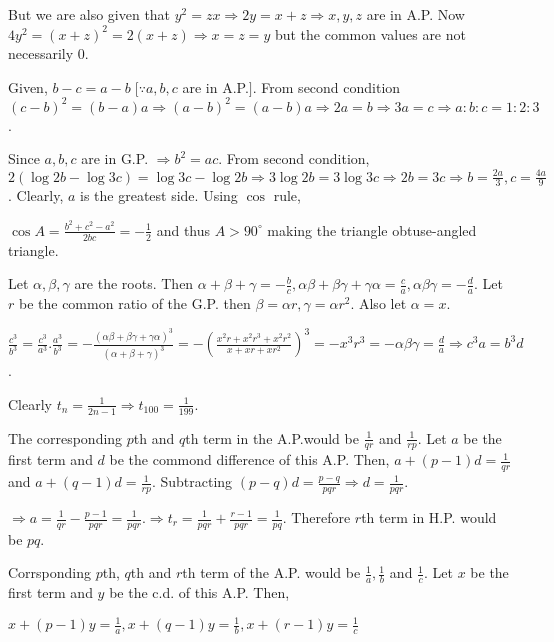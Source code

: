   But we are also given that $y^2 = zx \Rightarrow 2y = x + z \Rightarrow x, y, z$ are in A.P. Now $4y^2 =
  (x + z)^2 = 2(x + z) \Rightarrow x = z = y$ but the common values are not necessarily $0$.
\item Given, $b - c = a - b\;[\because a, b, c$ are in A.P.$]$. From second condition $(c - b)^2 = (b - a)a
  \Rightarrow (a - b)^2 = (a - b)a \Rightarrow 2a = b \Rightarrow 3a = c \Rightarrow a:b:c = 1:2:3$.
\item Since $a, b, c$ are in G.P. $\Rightarrow b^2 = ac$. From second condition, $2(\log 2b - \log 3c) =
  \log 3c - \log 2b \Rightarrow 3\log 2b = 3\log 3c \Rightarrow 2b = 3c \Rightarrow b = \frac{2a}{3}, c =
  \frac{4a}{9}$. Clearly, $a$ is the greatest side. Using $\cos$ rule,

  $\cos A = \frac{b^2 + c^2 - a^2}{2bc} = -\frac{1}{2}$ and thus $A > 90^\circ$ making the triangle
  obtuse-angled triangle.
\item Let $\alpha, \beta, \gamma$ are the roots. Then $\alpha + \beta + \gamma = -\frac{b}{c}, \alpha\beta +
  \beta\gamma + \gamma\alpha = \frac{c}{a}, \alpha\beta\gamma = -\frac{d}{a}$. Let $r$ be the common ratio
  of the G.P. then $\beta = \alpha r, \gamma = \alpha r^2$. Also let $\alpha = x$.

  $\frac{c^3}{b^3} = \frac{c^3}{a^3}.\frac{a^3}{b^3} = -\frac{(\alpha\beta + \beta\gamma +
    \gamma\alpha)^3}{(\alpha + \beta + \gamma)^3} = -\left(\frac{x^2r + x^2r^3 + x^2r^2}{x + xr +
    xr^2}\right)^3 = -x^3r^3 = -\alpha\beta\gamma = \frac{d}{a} \Rightarrow c^3a = b^3d$.
\item Clearly $t_n = \frac{1}{2n - 1} \Rightarrow t_{100} = \frac{1}{199}$.
\item The corresponding $p$th and $q$th term in the A.P.would be $\frac{1}{qr}$ and $\frac{1}{rp}$. Let $a$
  be the first term and $d$ be the commond difference of this A.P. Then, $a + (p - 1)d = \frac{1}{qr}$ and
  $a + (q - 1)d = \frac{1}{rp}$. Subtracting $(p - q)d = \frac{p - q}{pqr} \Rightarrow d = \frac{1}{pqr}$.

  $\Rightarrow a = \frac{1}{qr} - \frac{p - 1}{pqr} = \frac{1}{pqr}. \Rightarrow t_r = \frac{1}{pqr} +
  \frac{r - 1}{pqr} = \frac{1}{pq}$. Therefore $r$th term in H.P. would be $pq$.
\item Corrsponding $p$th, $q$th and $r$th term of the A.P. would be $\frac{1}{a}, \frac{1}{b}$ and
  $\frac{1}{c}$. Let $x$ be the first term and $y$ be the c.d. of this A.P. Then,

  $x + (p - 1)y = \frac{1}{a}, x + (q - 1)y = \frac{1}{b}, x + (r - 1)y = \frac{1}{c}$

